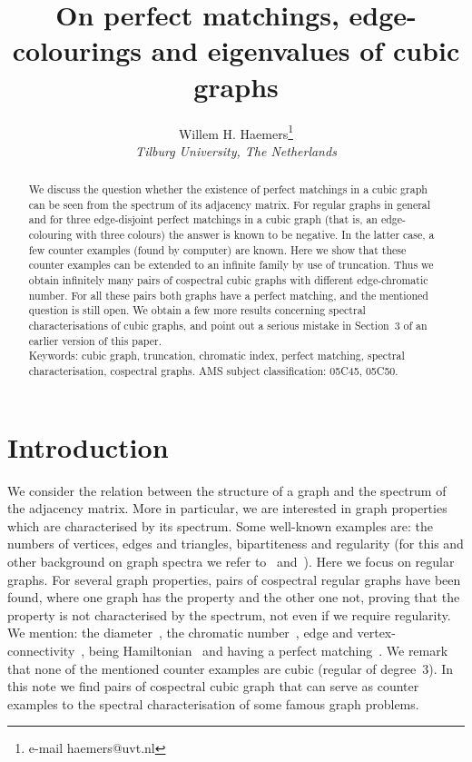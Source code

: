 \documentclass{article}
\title{On perfect matchings, edge-colourings and eigenvalues of cubic graphs}
\author{Willem H. Haemers\thanks{e-mail haemers@uvt.nl}
\\
{\it\small Tilburg University, The Netherlands}
}
\date{}
\begin{document}
\maketitle
\begin{abstract}
We discuss the question whether the existence of perfect matchings in a cubic graph can be seen from the spectrum of its adjacency matrix. 
For regular graphs in general and
for three edge-disjoint perfect matchings in a cubic graph (that is, an edge-colouring with three colours) 
the answer is known to be negative.
In the latter case, a few counter examples (found by computer) are known.
Here we show that these counter examples can be extended to an infinite family by use of truncation.
Thus we obtain infinitely many pairs of cospectral cubic graphs with different edge-chromatic number.
For all these pairs both graphs have a perfect matching, and the mentioned question is still open.
We obtain a few more results concerning spectral characterisations of cubic graphs, and point out a serious mistake in Section~3 of an earlier version of this paper.
\\  
Keywords: cubic graph, truncation, chromatic index, perfect matching, 
spectral characterisation, cospectral graphs.
AMS subject classification: 05C45, 05C50.
\end{abstract}

\section{Introduction}

We consider the relation between the structure of a graph and the spectrum of the adjacency matrix. 
More in particular, we are interested in graph properties which are characterised by its spectrum.
Some well-known examples are: the numbers of vertices, edges and triangles, bipartiteness and regularity 
(for this and other background on graph spectra we refer to~\cite{BH} and~\cite{DH}).
Here we focus on regular graphs.
For several graph properties, pairs of cospectral regular graphs have been found, where one graph has the property and the other one not, proving that the property is not characterised by the spectrum, not even if we require regularity. 
We mention: the diameter~\cite{HS}, the chromatic number~\cite{EH}, edge and vertex-connectivity~\cite{H}, being Hamiltonian~\cite{EH} and having a perfect matching~\cite{BCH}.
We remark that none of the mentioned counter examples are cubic (regular of degree~3).
In this note we find pairs of cospectral cubic graph that can serve as counter examples to the spectral characterisation of some famous graph problems.
\end{document}
